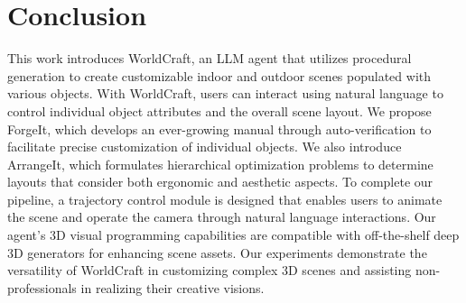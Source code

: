 \section{Conclusion}
 This work introduces WorldCraft, an LLM agent that utilizes procedural generation to create customizable indoor and outdoor scenes populated with various objects. With WorldCraft, users can interact using natural language to control individual object attributes and the overall scene layout. We propose ForgeIt, which develops an ever-growing manual through auto-verification to facilitate precise customization of individual objects. We also introduce ArrangeIt, which formulates hierarchical optimization problems to determine layouts that consider both ergonomic and aesthetic aspects. To complete our pipeline,  a trajectory control module is designed that enables users to animate the scene and operate the camera through natural language interactions. Our agent's 3D visual programming capabilities are compatible with off-the-shelf deep 3D generators for enhancing scene assets.
%
Our experiments demonstrate the versatility of WorldCraft in customizing complex 3D scenes and assisting non-professionals in realizing their creative visions.